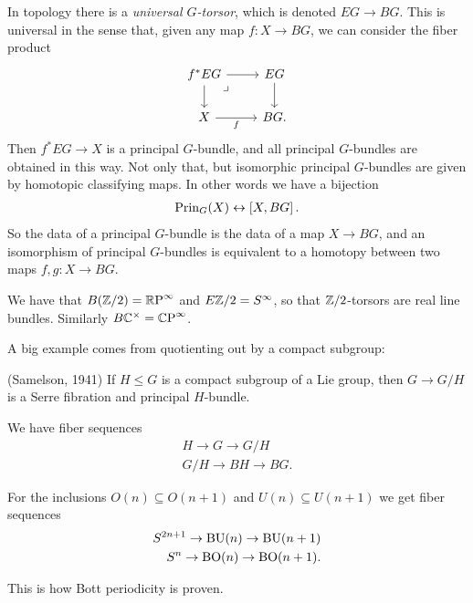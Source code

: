 \documentclass[11pt,openany]{book}
\begin{document}
In topology there is a \textit{universal $G$-torsor}, which is denoted $EG \to BG$. This is universal in the sense that, given any map $f \colon X \to BG$, we can consider the fiber product
\[ \begin{tikzcd}
    f^\ast EG\rar\dar\pb & EG\dar\\
    X\rar["f" below] & BG.
\end{tikzcd} \]
Then $f^\ast EG \to X$ is a principal $G$-bundle, and all principal $G$-bundles are obtained in this way. Not only that, but isomorphic principal $G$-bundles are given by homotopic classifying maps. In other words we have a bijection
\begin{align*}
    \mathrm{Prin}_G(X) \leftrightarrow \left[ X,BG \right].
\end{align*}
%
So the data of a principal $G$-bundle is the data of a map $X \to BG$, and an isomorphism of principal $G$-bundles is equivalent to a homotopy between two maps $f,g \colon X \to BG$.

\begin{example} We have that $B(\mathbb{Z}/2) ={\mathbb{R}\text{P}}^\infty$ and $E\mathbb{Z}/2 = S^\infty$, so that $\mathbb{Z}/2$-torsors are real line bundles. Similarly $B\mathbb{C}^\times = {\mathbb{C}\text{P}}^\infty$.
\end{example}

A big example comes from quotienting out by a compact subgroup:

\begin{theorem} (Samelson, 1941) If $H \le G$ is a compact subgroup of a Lie group, then $G \to G/H$ is a Serre fibration and principal $H$-bundle.
\end{theorem}

\begin{corollary} We have fiber sequences
\begin{align*}
    H \to G \to G/H \\
    G/H \to BH \to BG.
\end{align*}
\end{corollary}

\begin{example} For the inclusions $O(n) \subseteq O(n+1)$ and $U(n) \subseteq U(n+1)$ we get fiber sequences
\begin{align*}
    S^{2n+1} \to \mathrm{BU}(n) \to \mathrm{BU}(n+1) \\
    S^n \to \mathrm{BO}(n) \to \mathrm{BO}(n+1).
\end{align*}
\end{example}
This is how Bott periodicity is proven.
\end{document}
